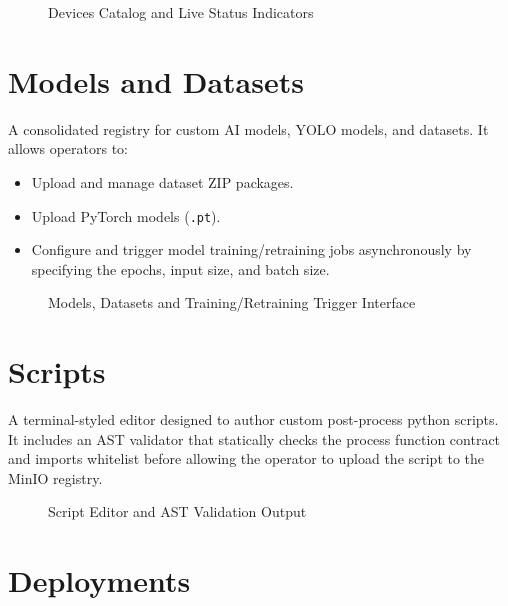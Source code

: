 \begin{figure}[H]
    \centering
    \caption{Devices Catalog and Live Status Indicators}
    \label{fig:screenshot_devices}
\end{figure}

\section{Models and Datasets}

A consolidated registry for custom \gls{AI} models, YOLO models, and datasets. It allows operators to:
\begin{itemize}
    \item Upload and manage dataset ZIP packages.
    \item Upload PyTorch models (\texttt{.pt}).
    \item Configure and trigger model training/retraining jobs asynchronously by specifying the epochs, input size, and batch size.
\end{itemize}

\begin{figure}[H]
    \centering
    \caption{Models, Datasets and Training/Retraining Trigger Interface}
    \label{fig:screenshot_models}
\end{figure}

\section{Scripts}

A terminal-styled editor designed to author custom post-process python scripts. It includes an \gls{AST} validator that statically checks the process function contract and imports whitelist before allowing the operator to upload the script to the MinIO registry.

\begin{figure}[H]
    \centering
    \caption{Script Editor and \acrshort{AST} Validation Output}
    \label{fig:screenshot_scripts}
\end{figure}

\section{Deployments}

